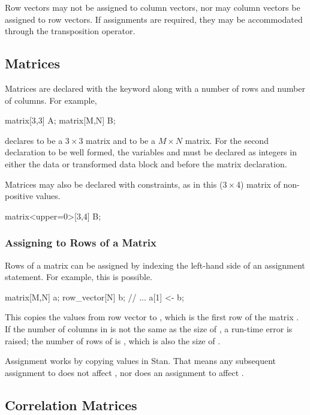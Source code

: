 Row vectors may not be assigned to column vectors, nor may column
vectors be assigned to row vectors.  If assignments are required, they
may be accommodated through the transposition operator.

\subsection{Matrices}

Matrices are declared with the keyword  along with a
number of rows and number of columns.  For example,
%
\begin{stancode}
matrix[3,3] A;
matrix[M,N] B;
\end{stancode}
%
declares  to be a $3 \times 3$ matrix and  to be a $M
\times N$ matrix.  For the second declaration to be well formed, the
variables  and  must be declared as integers in either
the data or transformed data block and before the matrix declaration.

Matrices may also be declared with constraints, as in this ($3 \times $4)
matrix of non-positive values.
%
\begin{stancode}
matrix<upper=0>[3,4] B;
\end{stancode}
%

\subsubsection{Assigning to Rows of a Matrix}

Rows of a matrix can be assigned by indexing the left-hand side of an
assignment statement. For example, this is possible.
%
\begin{stancode}
matrix[M,N] a;
row_vector[N] b;
// ...
a[1] <- b;
\end{stancode}
%
This copies the values from row vector  to , which
is the first row of the matrix .  If the number of columns in
 is not the same as the size of , a run-time error is
raised;  the number of rows of  is , which is also the
size of .

Assignment works by copying values in Stan.  That means any subsequent
assignment to  does not affect , nor does an
assignment to  affect .


\subsection{Correlation Matrices}

